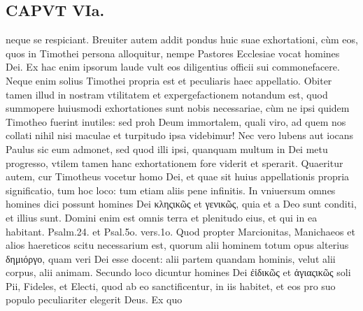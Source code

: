 \documentclass{article}
\begin{document}
\begin{pages}
\section*{CAPVT VIa. }
\marginpar{[ p.459 ]}\pstart neque  se respiciant. Breuiter autem addit pondus huic suae exhortationi, cùm eos, quos in Timothei persona alloquitur, nempe Pastores Ecclesiae vocat homines Dei. Ex hac enim ipsorum laude vult eos diligentius officii sui commonefacere. Neque enim solius Timothei propria est et peculiaris haec appellatio. Obiter tamen illud in nostram vtilitatem et expergefactionem notandum est, quod summopere huiusmodi exhortationes sunt nobis necessariae, cùm ne ipsi quidem Timotheo fuerint inutiles: sed proh Deum immortalem, quali viro, ad quem nos collati nihil nisi maculae et turpitudo ipsa videbimur! Nec vero lubens aut iocans Paulus sic eum admonet, sed quod illi ipsi, quanquam multum in Dei metu progresso, vtilem tamen hanc exhortationem fore viderit et sperarit.  \pend\pstart Quaeritur autem, cur Timotheus vocetur homo Dei, et quae sit huius appellationis propria significatio, tum hoc loco: tum etiam aliis pene infinitis. In vniuersum omnes homines dici possunt homines Dei κληςικῶς et γενικῶς, quia et a Deo sunt conditi, et illius sunt. Domini enim est omnis terra et plenitudo eius, et qui in ea habitant. Psalm.24. et Psal.5o. vers.1o. Quod propter Marcionitas, Manichaeos et alios haereticos scitu necessarium est, quorum alii hominem totum opus alterius δημιόργο, quam veri Dei esse docent: alii partem quandam hominis, velut alii corpus, alii animam. Secundo loco dicuntur homines Dei ἐἰδικῶς et ἀγιαςικῶς soli Pii, Fideles, et Electi, quod ab eo sanctificentur, in iis habitet, et eos pro suo populo peculiariter elegerit Deus. Ex quo  \pend

\end{pages}
\end{document}
